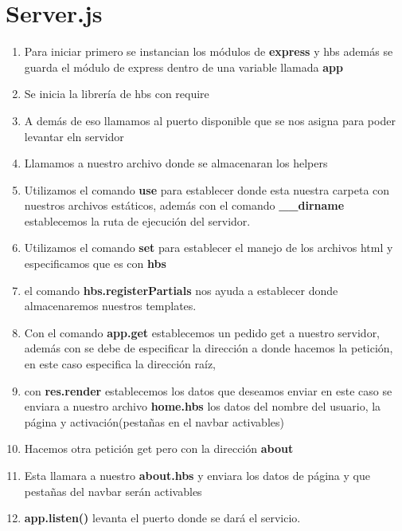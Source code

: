 \documentclass{report}
\begin{document}
     \section{Server.js}
    
     \begin{enumerate}
       \item Para iniciar primero se instancian los módulos de \textbf{express} y hbs además se guarda el módulo de express dentro de una variable llamada \textbf{app}
       
       \item Se inicia la librería de hbs con require
       \item A demás de eso llamamos al puerto disponible que se nos asigna para poder levantar eln servidor
       \item Llamamos a nuestro archivo donde se almacenaran los helpers
       
      
    \item Utilizamos el comando \textbf{use} para establecer donde esta nuestra carpeta con nuestros archivos estáticos, además con el comando \textbf{\_\_dirname} establecemos la ruta de ejecución del servidor.
    \item  Utilizamos el comando \textbf{set} para establecer el manejo de los archivos html y especificamos que es con \textbf{hbs}
    \item el comando \textbf{hbs.registerPartials} nos ayuda a establecer donde almacenaremos nuestros templates.
    

    \item Con el comando \textbf{app.get} establecemos un pedido get a nuestro servidor, además con se debe de especificar la dirección a donde hacemos la petición, en este caso \textbf{\/} especifica la dirección raíz,
    \item con \textbf{res.render} establecemos los datos que deseamos enviar en este caso se enviara a nuestro archivo \textbf{home.hbs} los datos del nombre del usuario, la página y activación(pestañas en el navbar activables)
    
    \item Hacemos otra petición get pero con la dirección \textbf{\/about}
    \item Esta llamara a nuestro \textbf{about.hbs} y enviara los datos de página y que pestañas del navbar serán activables
  
  \item \textbf{app.listen()} levanta el puerto donde se dará el servicio.
  

\end{enumerate}
\end{document}
